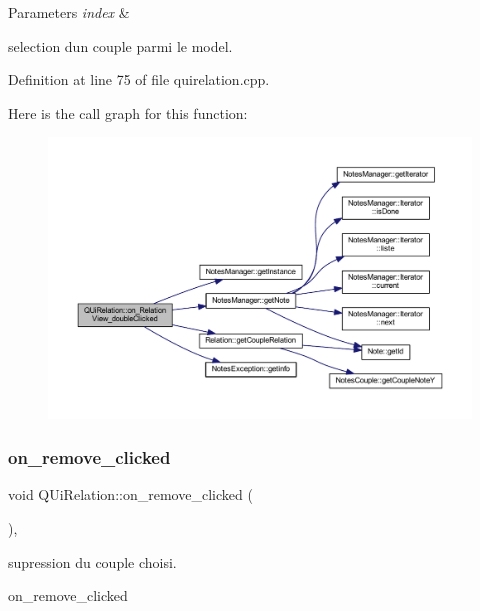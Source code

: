 \begin{DoxyParams}{Parameters}
{\em index} & \\
\hline
\end{DoxyParams}
selection d\textquotesingle{}un couple parmi le model. 

Definition at line 75 of file quirelation.\+cpp.

Here is the call graph for this function\+:\nopagebreak
\begin{figure}[H]
\begin{center}
\leavevmode
\includegraphics[width=350pt]{class_q_ui_relation_a28751a4ca2c2efb17c12bb45811a4b27_cgraph}
\end{center}
\end{figure}
\mbox{\label{class_q_ui_relation_a14fddadaa70fa8c82a0e49a547e2f6b5}} 
\subsubsection{\texorpdfstring{on\+\_\+remove\+\_\+clicked}{on\_remove\_clicked}}
{\footnotesize\ttfamily void Q\+Ui\+Relation\+::on\+\_\+remove\+\_\+clicked (\begin{DoxyParamCaption}{ }\end{DoxyParamCaption})\hspace{0.3cm}{\ttfamily [inline]}, {\ttfamily [slot]}}



supression du couple choisi. 

on\+\_\+remove\+\_\+clicked

